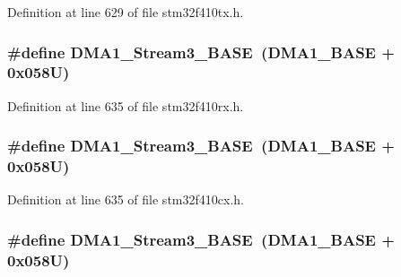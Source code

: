 Definition at line 629 of file stm32f410tx.\+h.

\subsubsection[{\texorpdfstring{D\+M\+A1\+\_\+\+Stream3\+\_\+\+B\+A\+SE}{DMA1_Stream3_BASE}}]{\setlength{\rightskip}{0pt plus 5cm}\#define D\+M\+A1\+\_\+\+Stream3\+\_\+\+B\+A\+SE~({\bf D\+M\+A1\+\_\+\+B\+A\+SE} + 0x058\+U)}\hypertarget{group___peripheral__registers__structures_gac51deb54ff7cfe1290dfcf517ae67127}{}\label{group___peripheral__registers__structures_gac51deb54ff7cfe1290dfcf517ae67127}


Definition at line 635 of file stm32f410rx.\+h.

\subsubsection[{\texorpdfstring{D\+M\+A1\+\_\+\+Stream3\+\_\+\+B\+A\+SE}{DMA1_Stream3_BASE}}]{\setlength{\rightskip}{0pt plus 5cm}\#define D\+M\+A1\+\_\+\+Stream3\+\_\+\+B\+A\+SE~({\bf D\+M\+A1\+\_\+\+B\+A\+SE} + 0x058\+U)}\hypertarget{group___peripheral__registers__structures_gac51deb54ff7cfe1290dfcf517ae67127}{}\label{group___peripheral__registers__structures_gac51deb54ff7cfe1290dfcf517ae67127}


Definition at line 635 of file stm32f410cx.\+h.

\subsubsection[{\texorpdfstring{D\+M\+A1\+\_\+\+Stream3\+\_\+\+B\+A\+SE}{DMA1_Stream3_BASE}}]{\setlength{\rightskip}{0pt plus 5cm}\#define D\+M\+A1\+\_\+\+Stream3\+\_\+\+B\+A\+SE~({\bf D\+M\+A1\+\_\+\+B\+A\+SE} + 0x058\+U)}\hypertarget{group___peripheral__registers__structures_gac51deb54ff7cfe1290dfcf517ae67127}{}\label{group___peripheral__registers__structures_gac51deb54ff7cfe1290dfcf517ae67127}


